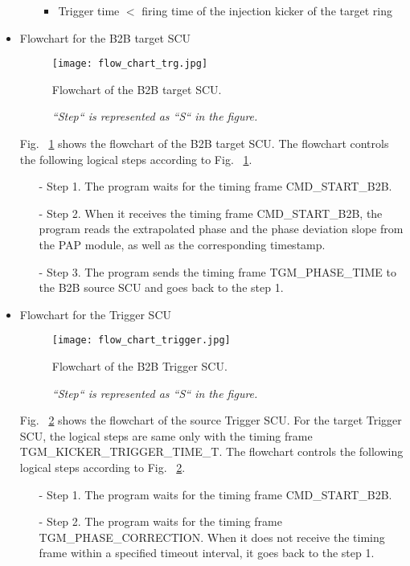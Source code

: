 \begin{itemize}
\begin{itemize}
\begin{itemize}
	\item Trigger time $<$ firing time of the injection kicker of the target ring

\end{itemize}
 

	\end{itemize}
\item Flowchart for the B2B target SCU
\begin{figure}[H]
   \centering   
   \texttt{[image: flow\_chart\_trg.jpg]}
   \caption{Flowchart of the B2B target SCU.}
	\caption*{\textsl{\small{``Step`` is represented as ``S`` in the figure. }}}
   \label{flow_chart_trg}
\end{figure}
Fig. ~\ref{flow_chart_trg} shows the flowchart of the B2B target SCU. The flowchart controls the following logical steps according to Fig. ~\ref{flow_chart_trg}.
 	\begin{itemize}
		\item[-]Step 1. The program waits for the timing frame CMD\_START\_B2B.
 		\item[-]Step 2. When it receives the timing frame CMD\_START\_B2B, the program reads the extrapolated phase and the phase deviation slope from the PAP module, as well as the corresponding timestamp.
		\item[-]Step 3. The program sends the timing frame TGM\_PHASE\_TIME to the B2B source SCU and goes back to the step 1.
	\end{itemize}
\item Flowchart for the Trigger SCU
\begin{figure}[H]
   \centering   
   \texttt{[image: flow\_chart\_trigger.jpg]}
   \caption{Flowchart of the B2B Trigger SCU.}
	\caption*{\textsl{\small{``Step`` is represented as ``S`` in the figure.}}}
   \label{flow_chart_trigger}
\end{figure}
Fig. ~\ref{flow_chart_trigger} shows the flowchart of the source Trigger SCU. For the target Trigger SCU, the logical steps are same only with the timing frame TGM\_KICKER\_TRIGGER\_TIME\_T. The flowchart controls the following logical steps according to Fig. ~\ref{flow_chart_trigger}.
 	\begin{itemize}
		\item[-]Step 1. The program waits for the timing frame CMD\_START\_B2B. 
		\item[-]Step 2. The program waits for the timing frame TGM\_PHASE\_CORRECTION. When it does not receive the timing frame within a specified timeout interval, it goes back to the step 1.

\end{itemize}
\end{itemize}
